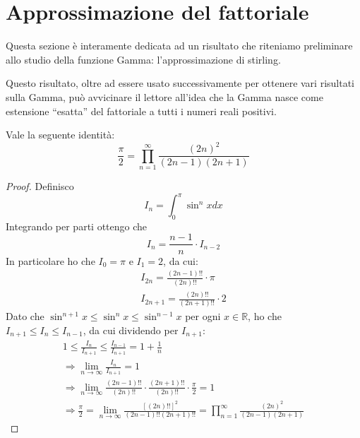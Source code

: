 \section{Approssimazione del fattoriale}
Questa sezione è interamente dedicata ad un risultato che riteniamo preliminare allo studio della funzione Gamma:
l'approssimazione di stirling.

Questo risultato, oltre ad essere usato successivamente per ottenere vari risultati sulla Gamma, può avvicinare il lettore
all'idea che la Gamma nasce come estensione ``esatta'' del fattoriale a tutti i numeri reali positivi.

\begin{lemma}\label{f:WallisProduct}
	Vale la seguente identità:
	\begin{equation*}
		\frac{\pi}{2}=\prod_{n=1}^\infty\frac{(2n)^2}{(2n-1)(2n+1)}
	\end{equation*}
\end{lemma}
\begin{proof}
	Definisco
	\begin{equation*}
		I_n=\int_0^\pi \sin^n{x} dx
	\end{equation*}
	Integrando per parti ottengo che
	\begin{equation*}
		I_n=\frac{n-1}{n}\cdot I_{n-2}
	\end{equation*}
	In particolare ho che $I_0=\pi$ e $I_1=2$, da cui:
	\begin{gather*}
		I_{2n}=\frac{(2n-1)!!}{(2n)!!}\cdot\pi\\
		I_{2n+1}=\frac{(2n)!!}{(2n+1)!!}\cdot 2
	\end{gather*}
	Dato che $\sin^{n+1}x\le \sin^n x\le \sin^{n-1} x$ per ogni $x\in\mathbb{R}$, ho che $I_{n+1}\le I_n\le I_{n-1}$,
	da cui dividendo per $I_{n+1}$:
	\begin{gather*}
		1\le \frac{I_n}{I_{n+1}}\le \frac{I_{n-1}}{I_{n+1}}=1+\frac{1}{n}\\
		\Longrightarrow \lim_{n\to\infty}\frac{I_n}{I_{n+1}}=1\\
		\Longrightarrow \lim_{n\to\infty}\frac{(2n-1)!!}{(2n)!!}\cdot\frac{(2n+1)!!}{(2n)!!}\cdot\frac{\pi}{2}=1\\
		\Longrightarrow \frac{\pi}{2}=\lim_{n\to\infty}\frac{\left[(2n)!!\right]^2}{(2n-1)!!(2n+1)!!}=\prod_{n=1}^\infty\frac{(2n)^2}{(2n-1)(2n+1)}
	\end{gather*}
\end{proof}


